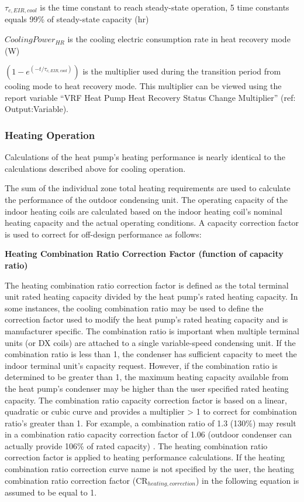 \(\tau_{c,EIR,cool}\) is the time constant to reach steady-state operation, 5 time constants equals 99\% of steady-state capacity (hr)

\(CoolingPower_{HR}\) is the cooling electric consumption rate in heat recovery mode (W)

\(\left( 1 - e^{\left( -t / \tau_{c,EIR,cool} \right)} \right)\) is the multiplier used during the transition period from cooling mode to heat recovery mode. This multiplier can be viewed using the report variable ``VRF Heat Pump Heat Recovery Status Change Multiplier'' (ref: Output:Variable).

\subsubsection{Heating Operation}\label{heating-operation-201605050924}

Calculations of the heat pump's heating performance is nearly identical to the calculations described above for cooling operation.

The sum of the individual zone total heating requirements are used to calculate the performance of the outdoor condensing unit. The operating capacity of the indoor heating coils are calculated based on the indoor heating coil's nominal heating capacity and the actual operating conditions. A capacity correction factor is used to correct for off-design performance as follows:

\textbf{Heating Combination Ratio Correction Factor (function of capacity ratio)}

The heating combination ratio correction factor is defined as the total terminal unit rated heating capacity divided by the heat pump's rated heating capacity. In some instances, the cooling combination ratio may be used to define the correction factor used to modify the heat pump's rated heating capacity and is manufacturer specific. The combination ratio is important when multiple terminal units (or DX coils) are attached to a single variable-speed condensing unit. If the combination ratio is less than 1, the condenser has sufficient capacity to meet the indoor terminal unit's capacity request. However, if the combination ratio is determined to be greater than 1, the maximum heating capacity available from the heat pump's condenser may be higher than the user specified rated heating capacity. The combination ratio capacity correction factor is based on a linear, quadratic or cubic curve and provides a multiplier > 1 to correct for combination ratio's greater than 1. For example, a combination ratio of 1.3 (130\%) may result in a combination ratio capacity correction factor of 1.06 (outdoor condenser can actually provide 106\% of rated capacity) . The heating combination ratio correction factor is applied to heating performance calculations. If the heating combination ratio correction curve name is not specified by the user, the heating combination ratio correction factor (CR\(_{heating,correction}\)) in the following equation is assumed to be equal to 1.

